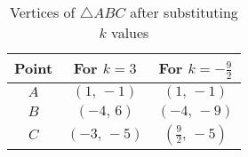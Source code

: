 \begin{table}[h!]
    \centering
    \begin{tabular}{|c|c|c|}
        \hline
        Point & For $k=3$ & For $k=-\tfrac{9}{2}$ \\
        \hline
        $A$ & $(1,\,-1)$ & $(1,\,-1)$ \\
        $B$ & $(-4,\,6)$ & $(-4,\,-9)$ \\
        $C$ & $(-3,\,-5)$ & $\left(\tfrac{9}{2},\,-5\right)$ \\
        \hline
    \end{tabular}
    \caption{Vertices of $\triangle ABC$ after substituting $k$ values}
    \label{tab:triangle_values}
\end{table}

